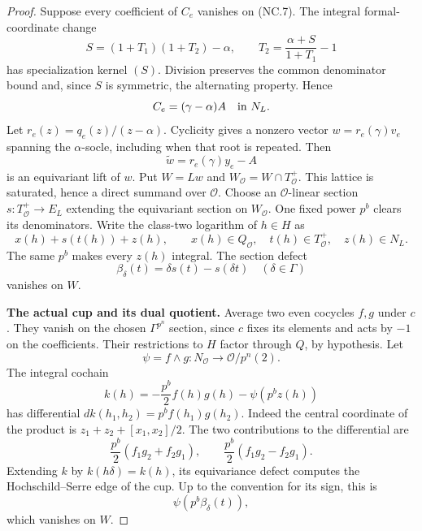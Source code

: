 \begin{proof}
Suppose every coefficient of \(C_e\) vanishes on (NC.7).
The integral formal-coordinate change
\[
 S=(1+T_1)(1+T_2)-\alpha,\qquad
 T_2=\frac{\alpha+S}{1+T_1}-1
\]
has specialization kernel \((S)\).  Division preserves the
common denominator bound and, since \(S\) is symmetric, the
alternating property.  Hence
\[
                        C_e=(\gamma-\alpha)A
                        \quad\hbox{in }N_L.
\]
Let \(r_e(z)=q_e(z)/(z-\alpha)\).  Cyclicity gives a nonzero
vector \(w=r_e(\gamma)v_e\) spanning the \(\alpha\)-socle,
including when that root is repeated.  Then
\[
                       \widetilde w=r_e(\gamma)y_e-A
\]
is an equivariant lift of \(w\).  Put \(W=Lw\) and
\(W_{\mathcal O}=W\cap T_{\mathcal O}^+\).
This lattice is saturated, hence a direct summand over
\(\mathcal O\).  Choose an \(\mathcal O\)-linear section
\(s:T_{\mathcal O}^+\to E_L\) extending the equivariant section
on \(W_{\mathcal O}\).  One fixed power \(p^b\) clears its
denominators.  Write the class-two logarithm of \(h\in H\) as
\[
 x(h)+s(t(h))+z(h),\qquad
 x(h)\in Q_{\mathcal O},\quad
 t(h)\in T_{\mathcal O}^+,\quad z(h)\in N_L.
\]
The same \(p^b\) makes every \(z(h)\) integral.  The section
defect
\[
            \beta_\delta(t)=\delta s(t)-s(\delta t)
            \quad(\delta\in\Gamma)
\]
vanishes on \(W\).

\par\medskip\noindent\textbf{The actual cup and its dual quotient.}
Average two even cocycles \(f,g\) under \(c\).
They vanish on the chosen \(\Gamma^{p^n}\) section, since \(c\)
fixes its elements and acts by \(-1\) on the coefficients.
Their restrictions to \(H\) factor through \(Q\), by hypothesis.
Let
\[
 \psi=f\wedge g:N_{\mathcal O}\longrightarrow
                  \mathcal O/p^n(2).
\]
The integral cochain
\[
       k(h)=-\frac{p^b}{2}f(h)g(h)-\psi(p^b z(h))            \tag{NC.10}
\]
has differential \(dk(h_1,h_2)=p^b f(h_1)g(h_2)\).
Indeed the central coordinate of the product is
\(z_1+z_2+[x_1,x_2]/2\).  The two contributions to the
differential are
\[
 \frac{p^b}{2}(f_1g_2+f_2g_1),\qquad
 \frac{p^b}{2}(f_1g_2-f_2g_1).
\]
Extending \(k\) by \(k(h\delta)=k(h)\), its equivariance
defect computes the Hochschild--Serre edge of the cup.
Up to the convention for its sign, this is
\[
                         \psi(p^b\beta_\delta(t)),          \tag{NC.11}
\]
which vanishes on \(W\).


\end{proof}
